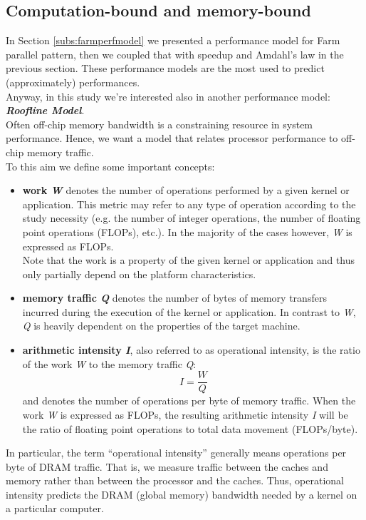 \subsection{Computation-bound and memory-bound}
\label{sect:roofline}
	In Section \ref{subs:farmperfmodel} we presented a performance model for Farm parallel pattern, then we coupled that with speedup and Amdahl's law in the previous section. These performance models are the most used to predict (approximately) performances.\\
	Anyway, in this study we're interested also in another performance model: \textit{\textbf{Roofline Model}}.\\
	Often off-chip memory bandwidth is a constraining  resource in system performance.
	Hence, we want a model that relates processor  performance  to off-chip  memory  traffic\cite{rooflinepaper}. \\
	To this aim we define some important concepts:
	\begin{itemize}
		\item \textbf{work \textit{W}} denotes the number of operations performed by a given kernel or application. This metric may refer to any type of operation according to the study necessity (e.g. the number of integer operations, the number of floating point operations (FLOPs), etc.). In the majority of the cases however, \textit{W} is expressed as FLOPs.\\	
		Note that the work is a property of the given kernel or application and thus only partially depend on the platform characteristics. 
		
		\item \textbf{memory traffic \textit{Q}} denotes the number of bytes of memory transfers incurred during the execution of the kernel or application. In contrast to \textit{W}, \textit{Q} is heavily dependent on the properties of the target machine\cite{rooflineslides}.%
		
		\item \textbf{arithmetic intensity \textit{I}}, also referred to as operational intensity, is the ratio of the work \textit{W} to the memory traffic \textit{Q}:
		\begin{equation}
			I = \frac{W}{Q}
		\end{equation}
		and denotes the number of operations per byte of memory traffic. When the work \textit{W} is expressed as FLOPs, the resulting arithmetic intensity \textit{I} will be the ratio of floating point operations to total data movement (FLOPs/byte)\cite{optimizingcuda,rooflineslides}. 
	\end{itemize}
	In particular, the term  “operational intensity” generally means operations per byte of  DRAM  traffic. That is, we measure traffic between the caches and memory rather than between the processor and the caches. 
	Thus, operational intensity predicts the DRAM (global memory) bandwidth needed by a kernel on a particular computer\cite{rooflinepaper,rooflineslides}.\\
	

